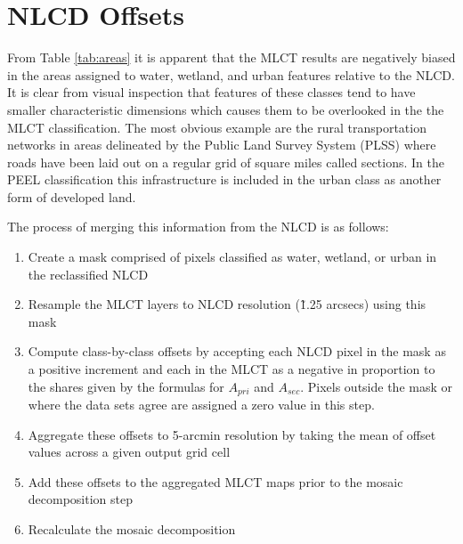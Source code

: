 \section{NLCD Offsets}
\label{sec:nlcd_offsets}


From Table \ref{tab:areas} it is apparent that the MLCT results are
negatively biased in the areas assigned to water, wetland, and urban
features relative to the NLCD.  It is clear from visual inspection
that features of these classes tend to have smaller characteristic
dimensions which causes them to be overlooked in the the MLCT
classification.  The most obvious example are the rural transportation
networks in areas delineated by the Public Land Survey System (PLSS)
where roads have been laid out on a regular grid of square miles
called sections.  In the PEEL classification this infrastructure is
included in the urban class as another form of developed land.

The process of merging this information from the NLCD is as follows:

\begin{enumerate}
  \item Create a mask comprised of pixels classified as water, wetland,
    or urban in the reclassified NLCD
  \item Resample the MLCT layers to NLCD resolution (\~1.25 arcsecs)
    using this mask
  \item Compute class-by-class offsets by accepting each NLCD pixel in
    the mask as a positive increment and each in the MLCT as a negative
    in proportion to the shares given by the formulas for $A_{pri}$ and
    $A_{sec}$.  Pixels outside the mask or where the data sets agree are
    assigned a zero value in this step.
  \item Aggregate these offsets to 5-arcmin resolution by taking the
    mean of offset values across a given output grid cell
  \item Add these offsets to the aggregated MLCT maps prior to the
    mosaic decomposition step
  \item Recalculate the mosaic decomposition
\end{enumerate}










